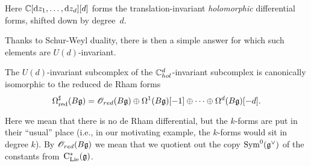 Here $\mathbb C[{\rm d} z_1,\ldots, {\rm d} z_d][d]$ forms the translation-invariant {\em holomorphic} differential forms, 
shifted down by degree~$d$.

Thanks to Schur-Weyl duality, there is then a simple answer for which such elements are $U(d)$-invariant.

\begin{lem}
The $U(d)$-invariant subcomplex of the $\mathbb C^d_{hol}$-invariant subcomplex 
is canonically isomorphic to the reduced de Rham forms
\[
\Omega^\sharp_{\rm red}(B\mathfrak g) = \mathscr O_{red}(B \mathfrak g) \oplus \Omega^{1} (B \mathfrak g)[-1] \oplus \cdots \oplus \Omega^{d}(B \mathfrak g)[-d]. 
\]
\end{lem}

Here we mean that there is no de Rham differential, 
but the $k$-forms are put in their ``usual'' place 
(i.e., in our motivating example, the $k$-forms would sit in degree $k$).
By $\mathscr O_{red}(B \mathfrak g)$ we mean that we quotient out the copy ${\rm Sym}^0(\mathfrak g^\vee)$ of the constants from~${\rm C}_{{\rm Lie}}^*(\mathfrak g)$.

